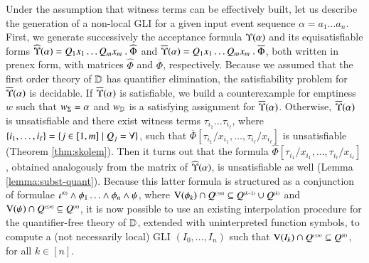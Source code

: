 Under the assumption that witness terms can be effectively built, let
us describe the generation of a non-local GLI for a given input event
sequence $\alpha = a_1 \ldots a_n$. First, we generate successively
the acceptance formula $\Upsilon({\alpha})$ and its equisatisfiable
forms $\widehat{\Upsilon}({\alpha}) = Q_1x_1 \ldots Q_mx_m ~.~ \widehat{\Phi}$
and $\overline{\Upsilon}({\alpha}) = Q_1x_1 \ldots Q_mx_m ~.~ \overline{\Phi}$,
both written in prenex form, with matrices $\widehat{\Phi}$ and
$\overline{\Phi}$, respectively. Because we assumed that the first
order theory of $\mathbb{D}$ has quantifier elimination, the satisfiability
problem for $\overline{\Upsilon}({\alpha})$ is decidable. If $\overline{\Upsilon}({\alpha})$
is satisfiable, we build a counterexample for emptiness $w$ such that
${w}_\Sigma=\alpha$ and ${w}_{\mathbb{D}}$ is a satisfying assignment for
$\overline{\Upsilon}({\alpha})$. Otherwise, $\overline{\Upsilon}({\alpha})$ is unsatisfiable
and there exist witness terms $\tau_{i_1} \ldots \tau_{i_\ell}$, where
$\{ i_1, \ldots, i_\ell \} = \{ j \in [1,m] \mid Q_j = \forall \}$,
such that $\overline{\Phi}[\tau_{i_1}/x_{i_1}, \ldots,
  \tau_{i_\ell}/x_{i_\ell}]$ is unsatisfiable (Theorem
\ref{thm:skolem}). Then it turns out that the formula
$\widehat{\Phi}[\tau_{i_1}/x_{i_1}, \ldots,
  \tau_{i_\ell}/x_{i_\ell}]$, obtained analogously from the matrix of
$\widehat{\Upsilon}({\alpha})$, is unsatisfiable as well (Lemma
\ref{lemma:subst-quant}). Because this latter formula is structured as
a conjunction of formulae ${\iota}^{\scriptscriptstyle{({0})}} \wedge \phi_1 \ldots
\wedge \phi_n \wedge \psi$, where $\mathrm{V}({\phi_k}) \cap {Q}^{\scriptscriptstyle{({\leq n})}}
\subseteq {Q}^{\scriptscriptstyle{({k-1})}} \cup {Q}^{\scriptscriptstyle{({k})}}$ and $\mathrm{V}({\psi}) \cap
{Q}^{\scriptscriptstyle{({\leq n})}} \subseteq {Q}^{\scriptscriptstyle{({n})}}$, it is now possible to use
an existing interpolation procedure for the quantifier-free theory of
$\mathbb{D}$, extended with uninterpreted function symbols, to compute a
(not necessarily local) GLI $(I_0, \ldots, I_n)$ such that $\mathrm{V}({I_k})
\cap {Q}^{\scriptscriptstyle{({\leq n})}} \subseteq {Q}^{\scriptscriptstyle{({k})}}$, for all $k \in [n]$.


